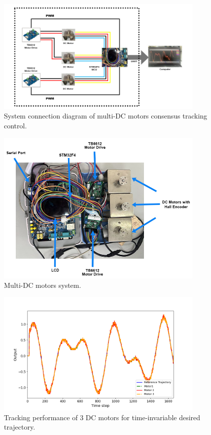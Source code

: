\documentclass[journal,onecolumn]{IEEEtran}
\begin{document}
\begin{figure}[H]
    \centering
    \includegraphics[width=0.9\textwidth]{diagram.jpg}
    \caption{System connection diagram of multi-DC motors consensus tracking control.}
    \label{fig:system_diagram} %
\end{figure}

\begin{figure}[H]
    \centering
    \includegraphics[width=0.9\textwidth]{system.jpg}
    \caption{Multi-DC motors system.}
    \label{fig:system} %
\end{figure}


\begin{figure}[H]
    \centering
    \includegraphics[width=0.9\textwidth]{dc_motor_tracking.png}
    \caption{Tracking performance of 3 DC motors for time-invariable desired trajectory.}
    \label{fig:output} %
\end{figure}
\end{document}
